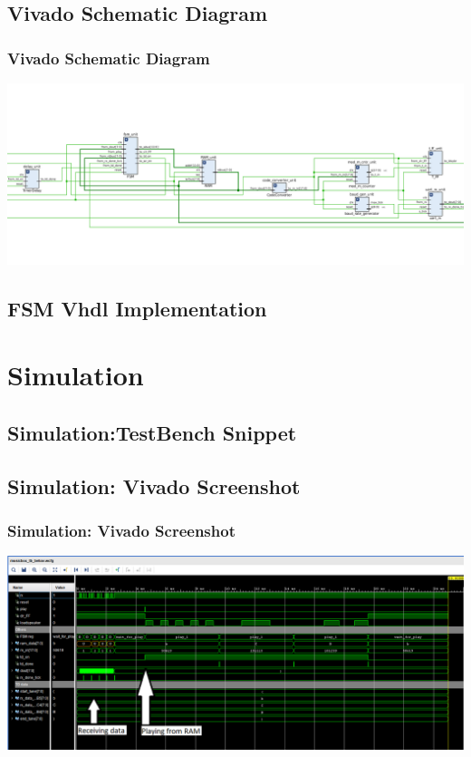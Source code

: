 \documentclass{beamer}
\begin{document}
\subsection{Vivado Schematic Diagram}
\begin{frame}
\frametitle{Vivado Schematic Diagram}
\includegraphics[width=\textwidth, height=0.8\textheight] {../diagram/schematic_diagram.png}
\end{frame}

\subsection{FSM Vhdl Implementation}
\begin{tiny}

\end{tiny}

\break

\section{Simulation}
\subsection{Simulation:TestBench Snippet}
\begin{tiny}

\end{tiny}

\break

\subsection{Simulation: Vivado Screenshot}
\begin{frame}
\frametitle{Simulation: Vivado Screenshot}
\includegraphics[width=\textwidth,height=0.8\textheight] {../diagram/musicbox_testbench.PNG}
\end{frame}
\end{document}
